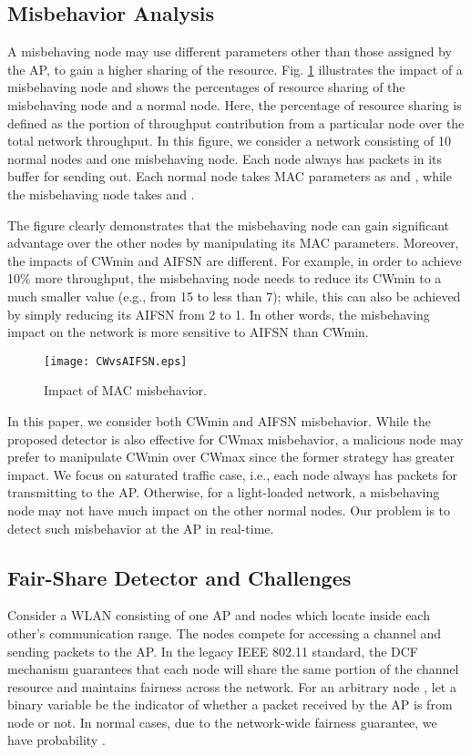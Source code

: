 \documentclass[conference]{IEEEtran}
\begin{document}
\subsection{Misbehavior Analysis}
A misbehaving node may use different parameters other than those assigned by the AP, to gain a higher sharing of the resource. Fig. \ref{fig:CWvsAIFSN} illustrates the impact of a misbehaving node and shows the percentages of resource sharing of the misbehaving node and a normal node. Here, the percentage of resource sharing is defined as the portion of throughput contribution from a particular node over the total network throughput. In this figure, we consider a network consisting of 10 normal nodes and one misbehaving node. Each node always has packets in its buffer for sending out. Each normal node takes MAC parameters as  and , while the misbehaving node takes  and .

The figure clearly demonstrates that the misbehaving node can gain significant advantage over the other nodes by manipulating its MAC parameters. Moreover, the impacts of CWmin and AIFSN are different. For example, in order to achieve 10\% more throughput, the misbehaving node needs to reduce its CWmin to a much smaller value (e.g., from 15 to less than 7); while, this can also be achieved by simply reducing its AIFSN from 2 to 1. In other words, the misbehaving impact on the network is more sensitive to AIFSN than CWmin.
\begin{figure}[htbp]
\vspace{-3mm}
  \centering
  \texttt{[image: CWvsAIFSN.eps]}
\vspace{-4mm}
  \caption{Impact of MAC misbehavior.}\label{fig:CWvsAIFSN}
\vspace{-3mm}
\end{figure}

In this paper, we consider both CWmin and AIFSN misbehavior. While the proposed detector is also effective for CWmax misbehavior, a malicious node may prefer to manipulate CWmin over CWmax since the former strategy has greater impact. We focus on saturated traffic case, i.e., each node always has packets for transmitting to the AP. Otherwise, for a light-loaded network, a misbehaving node may not have much impact on the other normal nodes. Our problem is to detect such misbehavior at the AP in real-time.

\subsection{Fair-Share Detector and Challenges}
Consider a WLAN consisting of one AP and  nodes which locate inside each other's communication range. The nodes compete for accessing a channel and sending packets to the AP. In the legacy IEEE 802.11 standard, the DCF mechanism guarantees that each node will share the same portion of the channel resource and maintains fairness across the network. For an arbitrary node , let a binary variable  be the indicator of whether a packet received by the AP is from node  or not. In normal cases, due to the network-wide fairness guarantee, we have probability .
\end{document}
